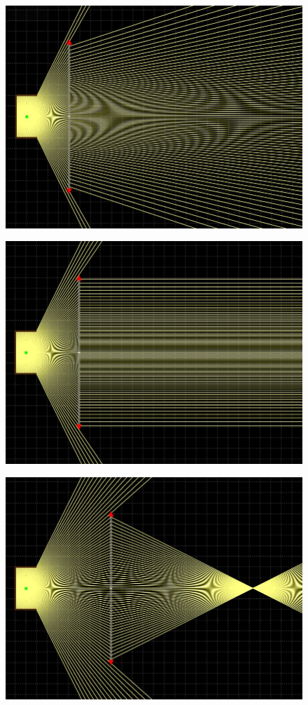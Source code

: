 \begin{figure}[H]
	\centering
	\begin{minipage}{.3\textwidth}
		\centering
		\includegraphics[width=.9\linewidth]{figures/litreview/lens_divergent_beam.JPG}
		\label{fig:lens_divergent}
	\end{minipage}%
	\begin{minipage}{.3\textwidth}
		\centering
		\includegraphics[width=.9\linewidth]{figures/litreview/lens_parallel_beam.JPG}
		\label{fig:lens_parallel}
	\end{minipage}
	\begin{minipage}{.3\textwidth}
		\centering
		\includegraphics[width=.9\linewidth]{figures/litreview/lens_focus_beam.JPG}

\end{minipage}
\end{figure}
